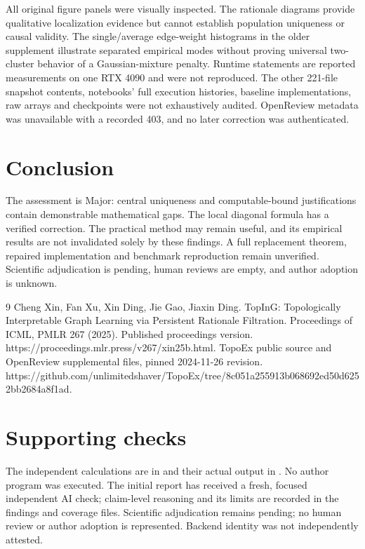 \documentclass[10pt]{article}
\begin{document}
All original figure panels were visually inspected. The rationale diagrams provide qualitative localization evidence but cannot establish population uniqueness or causal validity. The single/average edge-weight histograms in the older supplement illustrate separated empirical modes without proving universal two-cluster behavior of a Gaussian-mixture penalty. Runtime statements are reported measurements on one RTX 4090 and were not reproduced. The other 221-file snapshot contents, notebooks’ full execution histories, baseline implementations, raw arrays and checkpoints were not exhaustively audited. OpenReview metadata was unavailable with a recorded 403, and no later correction was authenticated.\par
\section*{Conclusion}
The assessment is Major: central uniqueness and computable-bound justifications contain demonstrable mathematical gaps. The local diagonal formula has a verified correction. The practical method may remain useful, and its empirical results are not invalidated solely by these findings. A full replacement theorem, repaired implementation and benchmark reproduction remain unverified. Scientific adjudication is pending, human reviews are empty, and author adoption is unknown.\par
9 Cheng Xin, Fan Xu, Xin Ding, Jie Gao, Jiaxin Ding. TopInG: Topologically Interpretable Graph Learning via Persistent Rationale Filtration. Proceedings of ICML, PMLR 267 (2025). Published proceedings version. https://proceedings.mlr.press/v267/xin25b.html. TopoEx public source and OpenReview supplemental files, pinned 2024-11-26 revision. https://github.com/unlimitedshaver/TopoEx/tree/8c051a255913b068692ed50d6252bb2684a8f1ad.\par
\section*{Supporting checks}
The independent calculations are in and their actual output in . No author program was executed. The initial report has received a fresh, focused independent AI check; claim-level reasoning and its limits are recorded in the findings and coverage files. Scientific adjudication remains pending; no human review or author adoption is represented. Backend identity was not independently attested.\par
\end{document}
